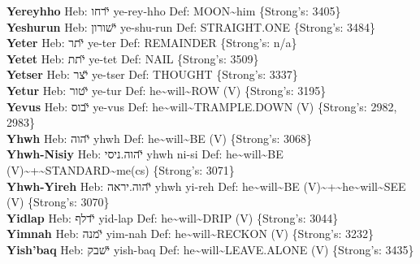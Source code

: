 {\textbf{Yereyhho} Heb: {\large\H ירחו} ye-rey-hho Def: MOON\textasciitilde{}him \{Strong's: 3405\}\hfill{}\\

\textbf{Yeshurun} Heb: {\large\H ישורון} ye-shu-run Def: STRAIGHT.ONE \{Strong's: 3484\}\hfill{}\\

\textbf{Yeter} Heb: {\large\H יתר} ye-ter Def: REMAINDER \{Strong's: n/a\}\hfill{}\\

\textbf{Yetet} Heb: {\large\H יתת} ye-tet Def: NAIL \{Strong's: 3509\}\hfill{}\\

\textbf{Yetser} Heb: {\large\H יצר} ye-tser Def: THOUGHT \{Strong's: 3337\}\hfill{}\\

\textbf{Yetur} Heb: {\large\H יטור} ye-tur Def: he\textasciitilde{}will\textasciitilde{}ROW (V) \{Strong's: 3195\}\hfill{}\\

\textbf{Yevus} Heb: {\large\H יבוס} ye-vus Def: he\textasciitilde{}will\textasciitilde{}TRAMPLE.DOWN (V) \{Strong's: 2982, 2983\}\hfill{}\\

\textbf{Yhwh} Heb: {\large\H יהוה} yhwh Def: he\textasciitilde{}will\textasciitilde{}BE (V) \{Strong's: 3068\}\hfill{}\\

\textbf{Yhwh-Nisiy} Heb: {\large\H יהוה.ניסי} yhwh ni-si Def: he\textasciitilde{}will\textasciitilde{}BE (V)\textasciitilde{}+\textasciitilde{}STANDARD\textasciitilde{}me(cs) \{Strong's: 3071\}\hfill{}\\

\textbf{Yhwh-Yireh} Heb: {\large\H יהוה.יראה} yhwh yi-reh Def: he\textasciitilde{}will\textasciitilde{}BE (V)\textasciitilde{}+\textasciitilde{}he\textasciitilde{}will\textasciitilde{}SEE (V) \{Strong's: 3070\}\hfill{}\\

\textbf{Yidlap} Heb: {\large\H ידלף} yid-lap Def: he\textasciitilde{}will\textasciitilde{}DRIP (V) \{Strong's: 3044\}\hfill{}\\

\textbf{Yimnah} Heb: {\large\H ימנה} yim-nah Def: he\textasciitilde{}will\textasciitilde{}RECKON (V) \{Strong's: 3232\}\hfill{}\\

\textbf{Yish'baq} Heb: {\large\H ישבק} yish-baq Def: he\textasciitilde{}will\textasciitilde{}LEAVE.ALONE (V) \{Strong's: 3435\}\hfill{}\\

}
